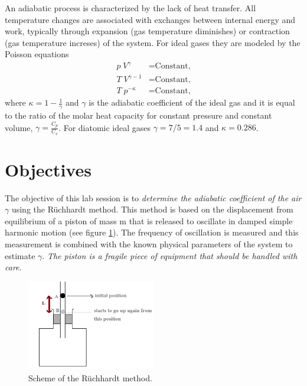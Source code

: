 \documentclass{article}
\begin{document}
An adiabatic process is characterized by the lack of heat
transfer. All temperature changes are associated with exchanges
between internal energy and work, typically through expansion (gas temperature
diminishes) or
contraction (gas temperature increses) of the system. For ideal gases they are modeled by the Poisson equations 
\begin{align}
p \; V^\gamma  &=  \text{Constant,}\\
T \; V^{\gamma-1}  &=  \text{Constant,}\\
T \; p^{-\kappa}  &=  \text{Constant,}
\end{align}
\noindent where $\kappa = 1-\frac{1}{\gamma}$ and $\gamma$ is the
adiabatic coefficient of the ideal gas and it is equal to the ratio of
the molar heat capacity for constant pressure and constant volume,
$\gamma = \frac{C_p}{C_v}$. For diatomic ideal gases $\gamma = 7/5 =
1.4$ and $\kappa = 0.286$.

\section{Objectives}

The objective of this lab session is to \textit{determine the adiabatic
coefficient of the air $\gamma$} using the R\"uchhardt method. This method is
based on the displacement from equilibrium of a piston of mass m that
is released to oscillate in damped simple harmonic motion (see figure \ref{fig_rucchardt}). The
frequency of oscillation is measured and this measurement is combined
with the known physical parameters of the system to estimate
$\gamma$. \textit{The piston is a fragile piece of equipment that
  should be handled with care}. 

\begin{figure}[h]
\begin{center}
\includegraphics[width=0.5\textwidth]{Figs/upload_2015-6-4_10-54-49.png} %
\caption{Scheme of the R\"uchhardt method.}\label{fig_rucchardt}
\end{center}
\end{figure}
\end{document}
